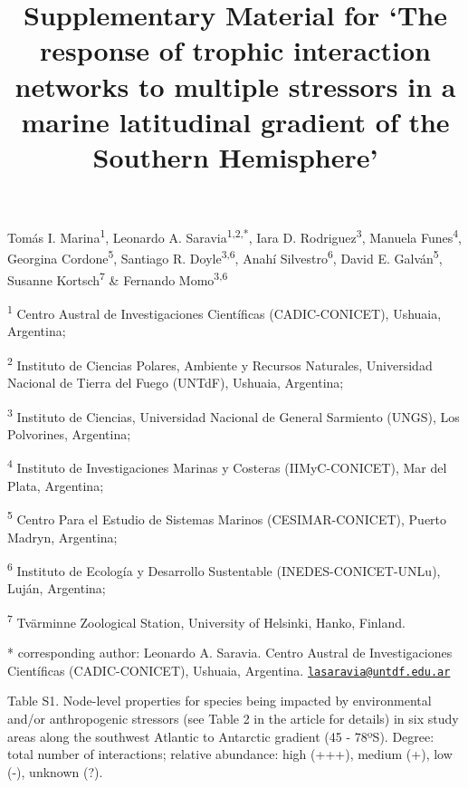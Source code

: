 \documentclass[
]{article}
\title{Supplementary Material for `The response of trophic interaction
networks to multiple stressors in a marine latitudinal gradient of the
Southern Hemisphere'}
\author{}
\date{\vspace{-2.5em}}
\begin{document}
\maketitle

Tomás I. Marina\textsuperscript{1}, Leonardo A.
Saravia\textsuperscript{1,2,*}, Iara D. Rodriguez\textsuperscript{3},
Manuela Funes\textsuperscript{4}, Georgina Cordone\textsuperscript{5},
Santiago R. Doyle\textsuperscript{3,6}, Anahí
Silvestro\textsuperscript{6}, David E. Galván\textsuperscript{5},
Susanne Kortsch\textsuperscript{7} \& Fernando Momo\textsuperscript{3,6}

\textsuperscript{1} Centro Austral de Investigaciones Científicas
(CADIC-CONICET), Ushuaia, Argentina;

\textsuperscript{2} Instituto de Ciencias Polares, Ambiente y Recursos
Naturales, Universidad Nacional de Tierra del Fuego (UNTdF), Ushuaia,
Argentina;

\textsuperscript{3} Instituto de Ciencias, Universidad Nacional de
General Sarmiento (UNGS), Los Polvorines, Argentina;

\textsuperscript{4} Instituto de Investigaciones Marinas y Costeras
(IIMyC-CONICET), Mar del Plata, Argentina;

\textsuperscript{5} Centro Para el Estudio de Sistemas Marinos
(CESIMAR-CONICET), Puerto Madryn, Argentina;

\textsuperscript{6} Instituto de Ecología y Desarrollo Sustentable
(INEDES-CONICET-UNLu), Luján, Argentina;

\textsuperscript{7} Tvärminne Zoological Station, University of
Helsinki, Hanko, Finland.

* corresponding author: Leonardo A. Saravia. Centro Austral de
Investigaciones Científicas (CADIC-CONICET), Ushuaia, Argentina.
\href{mailto:lasaravia@untdf.edu.ar}{\nolinkurl{lasaravia@untdf.edu.ar}}

\newpage

Table S1. Node-level properties for species being impacted by
environmental and/or anthropogenic stressors (see Table 2 in the article
for details) in six study areas along the southwest Atlantic to
Antarctic gradient (45 - 78ºS). Degree: total number of interactions;
relative abundance: high (+++), medium (+), low (-), unknown (?).
\end{document}
